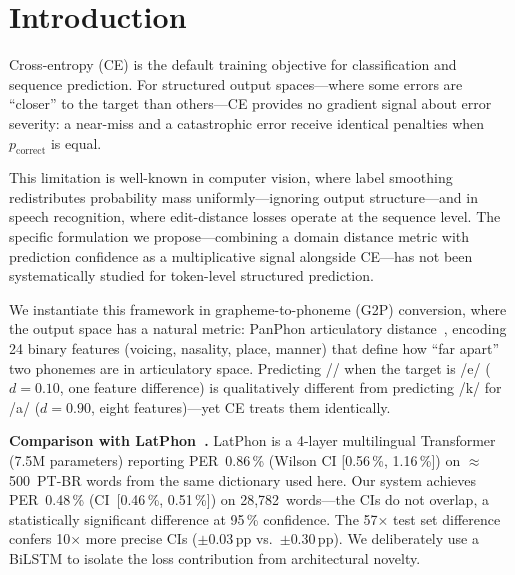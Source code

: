 \documentclass[conference]{IEEEtran}
\begin{document}
\section{Introduction}
\label{sec:intro}

Cross-entropy (CE) is the default training objective for
classification and sequence prediction.
For structured output spaces---where some errors are ``closer''
to the target than others---CE provides no gradient signal about
error severity: a near-miss and a catastrophic error receive
identical penalties when $p_\mathrm{correct}$ is equal.

This limitation is well-known in computer vision, where label
smoothing~\cite{szegedy2016rethinking} redistributes probability
mass uniformly---ignoring output structure---and in speech
recognition, where edit-distance losses operate at the sequence
level.
The specific formulation we propose---combining a domain distance
metric with prediction confidence as a multiplicative signal
alongside CE---has not been systematically studied for token-level
structured prediction.

We instantiate this framework in grapheme-to-phoneme (G2P)
conversion, where the output space has a natural metric: PanPhon
articulatory distance~\cite{mortensen2016panphon}, encoding 24
binary features (voicing, nasality, place, manner) that define how
``far apart'' two phonemes are in articulatory space.
Predicting // when the target is /e/ ($d\!=\!0.10$, one
feature difference) is qualitatively different from predicting /k/
for /a/ ($d\!=\!0.90$, eight features)---yet CE treats them
identically.

\textbf{Comparison with LatPhon~\cite{chary2025latphon}.}
LatPhon is a 4-layer multilingual Transformer (7.5M parameters)
reporting PER~0.86\,\% (Wilson CI [0.56\,\%, 1.16\,\%]) on
$\approx$500~PT-BR words from the same dictionary used here.
Our system achieves PER~0.48\,\% (CI~[0.46\,\%, 0.51\,\%]) on
28{,}782~words---the CIs do not overlap, a statistically significant
difference at 95\,\% confidence.
The 57$\times$ test set difference confers 10$\times$ more precise
CIs ($\pm$0.03\,pp vs.\ $\pm$0.30\,pp).
We deliberately use a BiLSTM to isolate the loss contribution from
architectural novelty.
\end{document}
